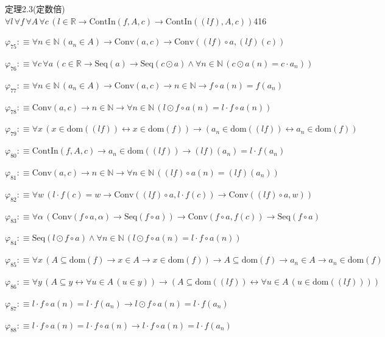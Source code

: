 \begin{fullproof}{定理2.3(定数倍)}{$\forall l\,\forall f\,\forall A\,\forall c\,(l \in \mathbb{R} \to \mathrm{ContIn}(f,A,c) \to \mathrm{ContIn}((l f),A,c))$}{416}
\begin{abbrevlist}
\item $\varphi_{75} :\equiv \forall n \in \mathbb{N}\,(a_{n} \in A) \to \mathrm{Conv}(a,c) \to \mathrm{Conv}((l f) \circ a,(l f)(c))$
\item $\varphi_{76} :\equiv \forall c\,\forall a\,(c \in \mathbb{R} \to \mathrm{Seq}(a) \to \mathrm{Seq}(c \odot a) \land \forall n \in \mathbb{N}\,(c \odot a(n) = c \cdot a_{n}))$
\item $\varphi_{77} :\equiv \forall n \in \mathbb{N}\,(a_{n} \in A) \to \mathrm{Conv}(a,c) \to n \in \mathbb{N} \to f \circ a(n) = f(a_{n})$
\item $\varphi_{78} :\equiv \mathrm{Conv}(a,c) \to n \in \mathbb{N} \to \forall n \in \mathbb{N}\,(l \odot f \circ a(n) = l \cdot f \circ a(n))$
\item $\varphi_{79} :\equiv \forall x\,(x \in \mathrm{dom}((l f)) \leftrightarrow x \in \mathrm{dom}(f)) \to (a_{n} \in \mathrm{dom}((l f)) \leftrightarrow a_{n} \in \mathrm{dom}(f))$
\item $\varphi_{80} :\equiv \mathrm{ContIn}(f,A,c) \to a_{n} \in \mathrm{dom}((l f)) \to (l f)(a_{n}) = l \cdot f(a_{n})$
\item $\varphi_{81} :\equiv \mathrm{Conv}(a,c) \to n \in \mathbb{N} \to \forall n \in \mathbb{N}\,((l f) \circ a(n) = (l f)(a_{n}))$
\item $\varphi_{82} :\equiv \forall w\,(l \cdot f(c) = w \to \mathrm{Conv}((l f) \circ a,l \cdot f(c)) \to \mathrm{Conv}((l f) \circ a,w))$
\item $\varphi_{83} :\equiv \forall \alpha\,(\mathrm{Conv}(f \circ a,\alpha) \to \mathrm{Seq}(f \circ a)) \to \mathrm{Conv}(f \circ a,f(c)) \to \mathrm{Seq}(f \circ a)$
\item $\varphi_{84} :\equiv \mathrm{Seq}(l \odot f \circ a) \land \forall n \in \mathbb{N}\,(l \odot f \circ a(n) = l \cdot f \circ a(n))$
\item $\varphi_{85} :\equiv \forall x\,(A \subseteq \mathrm{dom}(f) \to x \in A \to x \in \mathrm{dom}(f)) \to A \subseteq \mathrm{dom}(f) \to a_{n} \in A \to a_{n} \in \mathrm{dom}(f)$
\item $\varphi_{86} :\equiv \forall y\,(A \subseteq y \leftrightarrow \forall u \in A\,(u \in y)) \to (A \subseteq \mathrm{dom}((l f)) \leftrightarrow \forall u \in A\,(u \in \mathrm{dom}((l f))))$
\item $\varphi_{87} :\equiv l \cdot f \circ a(n) = l \cdot f(a_{n}) \to l \odot f \circ a(n) = l \cdot f(a_{n})$
\item $\varphi_{88} :\equiv l \cdot f \circ a(n) = l \cdot f \circ a(n) \to l \cdot f \circ a(n) = l \cdot f(a_{n})$

\end{abbrevlist}
\end{fullproof}
